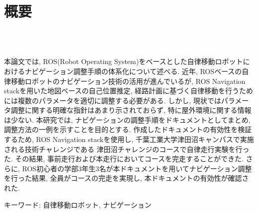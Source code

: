 \chapter*{概要}
\thispagestyle{empty}
%
\begin{center}
  \scalebox{1.5}{ROSベースの自律移動ロボットにおける}\\
  \scalebox{1.5}{ナビゲーション調整手順の体系化}\\
\end{center}
\vspace{1.0zh}
%

本論文では, ROS(Robot Operating System)をベースとした自律移動ロボットにおけるナビゲーション調整手順の体系化について述べる. 
近年, ROSベースの自律移動ロボットのナビゲーション技術の活用が進んでいるが, ROS Navigation stackを用いた地図ベースの自己位置推定, 経路計画に基づく自律移動を行うためには複数のパラメータを適切に調整する必要がある. 
しかし, 現状ではパラメータ調整に関する明確な指針はあまり示されておらず, 特に屋外環境に関する情報は少ない. 
本研究では, ナビゲーションの調整手順をドキュメントとしてまとめ, 調整方法の一例を示すことを目的とする. 
作成したドキュメントの有効性を検証するため, ROS Navigation stackを使用し, 千葉工業大学津田沼キャンパスで実施される技術チャレンジである
津田沼チャレンジのコースで自律走行実験を行った. その結果, 事前走行および本走行においてコースを完走することができた. 
さらに, ROS初心者の学部3年生3名が本ドキュメントを用いてナビゲーション調整を行った結果, 全員がコースの完走を実現し, 本ドキュメントの有効性が確認された. 

\vspace{1.0zh}

キーワード: 自律移動ロボット, ナビゲーション
%
\newpage
